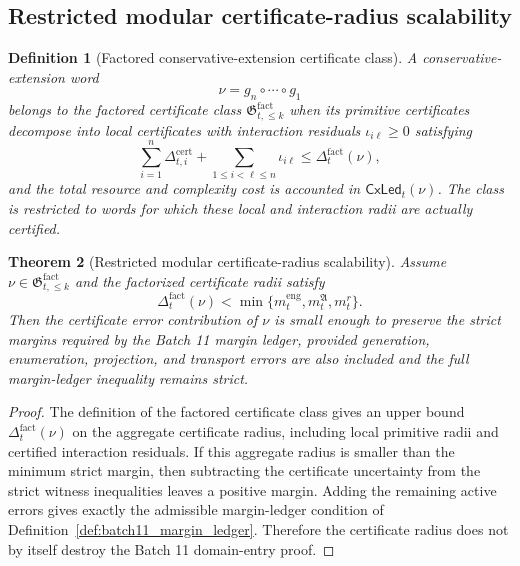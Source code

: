 \documentclass[11pt]{article}
\newtheorem{theorem}{Theorem}[section]
\newtheorem{definition}[theorem]{Definition}
\newcommand{\1}{\mathbf{1}}
\begin{document}
\subsection{Restricted modular certificate-radius scalability}

\begin{definition}[Factored conservative-extension certificate class]
\label{def:batch11_factored_ce_certificate_class}
A conservative-extension word
\[
\nu=g_n\circ\cdots\circ g_1
\]
belongs to the factored certificate class \(\mathfrak G_{t,\le k}^{\mathrm{fact}}\) when its primitive certificates decompose into local certificates with interaction residuals \(\iota_{i\ell}\ge0\) satisfying
\[
\sum_{i=1}^{n}\Delta_{t,i}^{\mathrm{cert}}
+
\sum_{1\le i<\ell\le n}\iota_{i\ell}
\le
\Delta_t^{\mathrm{fact}}(\nu),
\]
and the total resource and complexity cost is accounted in \(\mathsf{CxLed}_t(\nu)\).  The class is restricted to words for which these local and interaction radii are actually certified.
\end{definition}

\begin{theorem}[Restricted modular certificate-radius scalability]
\label{thm:batch11_restricted_certificate_radius_scalability}
Assume \(\nu\in\mathfrak G_{t,\le k}^{\mathrm{fact}}\) and the factorized certificate radii satisfy
\[
\Delta_t^{\mathrm{fact}}(\nu)
<
\min\{m_t^{\mathrm{eng}},m_t^{\mathfrak A},m_t^{r}\}.
\]
Then the certificate error contribution of \(\nu\) is small enough to preserve the strict margins required by the Batch 11 margin ledger, provided generation, enumeration, projection, and transport errors are also included and the full margin-ledger inequality remains strict.
\end{theorem}

\begin{proof}
The definition of the factored certificate class gives an upper bound \(\Delta_t^{\mathrm{fact}}(\nu)\) on the aggregate certificate radius, including local primitive radii and certified interaction residuals.  If this aggregate radius is smaller than the minimum strict margin, then subtracting the certificate uncertainty from the strict witness inequalities leaves a positive margin.  Adding the remaining active errors gives exactly the admissible margin-ledger condition of Definition~\ref{def:batch11_margin_ledger}.  Therefore the certificate radius does not by itself destroy the Batch 11 domain-entry proof.
\end{proof}
\end{document}
